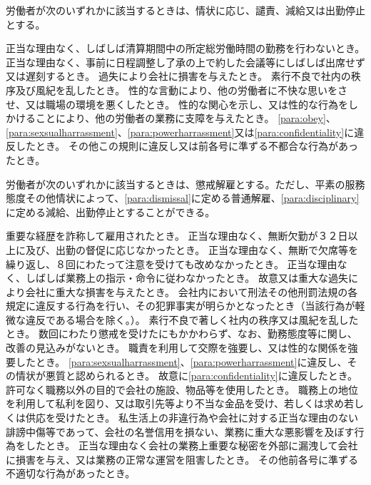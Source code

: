 \documentclass[10pt,a4paper,uplatex]{jsarticle}
\begin{document}
労働者が次のいずれかに該当するときは、情状に応じ、譴責、減給又は出勤停止とする。
\label{para:disciplinary}
\begin{enumerate}
    \itm 正当な理由なく、しばしば清算期間中の所定総労働時間の勤務を行わないとき。
    \itm 正当な理由なく、事前に日程調整し了承の上で約した会議等にしばしば出席せず又は遅刻するとき。
    \itm 過失により会社に損害を与えたとき。
    \itm 素行不良で社内の秩序及び風紀を乱したとき。
    \itm 性的な言動により、他の労働者に不快な思いをさせ、又は職場の環境を悪くしたとき。
    \itm 性的な関心を示し、又は性的な行為をしかけることにより、他の労働者の業務に支障を与えたとき。
    \itm \ref{para:obey}、\ref{para:sexsualharrassment}、\ref{para:powerharrassment}又は\ref{para:confidentiality}に違反したとき。
    \itm その他この規則に違反し又は前各号に準ずる不都合な行為があったとき。
\end{enumerate}
\term
労働者が次のいずれかに該当するときは、懲戒解雇とする。ただし、平素の服務態度その他情状によって、\ref{para:dismissal}に定める普通解雇、\ref{para:disciplinary}に定める減給、出勤停止とすることができる。
\begin{enumerate}
    \itm 重要な経歴を詐称して雇用されたとき。
    \itm 正当な理由なく、無断欠勤が３２日以上に及び、出勤の督促に応じなかったとき。
    \itm 正当な理由なく、無断で欠席等を繰り返し、８回にわたって注意を受けても改めなかったとき。
    \itm 正当な理由なく、しばしば業務上の指示・命令に従わなかったとき。
    \itm 故意又は重大な過失により会社に重大な損害を与えたとき。
    \itm 会社内において刑法その他刑罰法規の各規定に違反する行為を行い、その犯罪事実が明らかとなったとき（当該行為が軽微な違反である場合を除く。）。
    \itm 素行不良で著しく社内の秩序又は風紀を乱したとき。
    \itm 数回にわたり懲戒を受けたにもかかわらず、なお、勤務態度等に関し、改善の見込みがないとき。
    \itm 職責を利用して交際を強要し、又は性的な関係を強要したとき。
    \itm \ref{para:sexsualharrassment}、\ref{para:powerharrassment}に違反し、その情状が悪質と認められるとき。
    \itm 故意に\ref{para:confidentiality}に違反したとき。
    \itm 許可なく職務以外の目的で会社の施設、物品等を使用したとき。
    \itm 職務上の地位を利用して私利を図り、又は取引先等より不当な金品を受け、若しくは求め若しくは供応を受けたとき。
    \itm 私生活上の非違行為や会社に対する正当な理由のない誹謗中傷等であって、会社の名誉信用を損ない、業務に重大な悪影響を及ぼす行為をしたとき。
    \itm 正当な理由なく会社の業務上重要な秘密を外部に漏洩して会社に損害を与え、又は業務の正常な運営を阻害したとき。
    \itm その他前各号に準ずる不適切な行為があったとき。
\end{enumerate}
\end{document}
